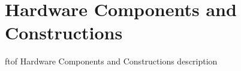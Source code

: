 \section{Hardware Components and Constructions}

ftof Hardware Components and Constructions description

